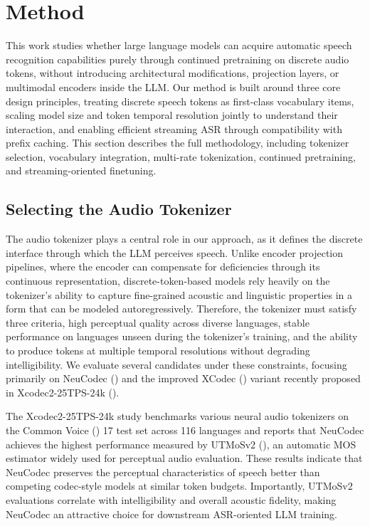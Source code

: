 \documentclass{article}
\begin{document}
\section{Method}

This work studies whether large language models can acquire automatic speech recognition capabilities purely through continued pretraining on discrete audio tokens, without introducing architectural modifications, projection layers, or multimodal encoders inside the LLM. Our method is built around three core design principles, treating discrete speech tokens as first-class vocabulary items, scaling model size and token temporal resolution jointly to understand their interaction, and enabling efficient streaming ASR through compatibility with prefix caching. This section describes the full methodology, including tokenizer selection, vocabulary integration, multi-rate tokenization, continued pretraining, and streaming-oriented finetuning.

\subsection{Selecting the Audio Tokenizer}

The audio tokenizer plays a central role in our approach, as it defines the discrete interface through which the LLM perceives speech. Unlike encoder projection pipelines, where the encoder can compensate for deficiencies through its continuous representation, discrete-token-based models rely heavily on the tokenizer's ability to capture fine-grained acoustic and linguistic properties in a form that can be modeled autoregressively. Therefore, the tokenizer must satisfy three criteria, high perceptual quality across diverse languages, stable performance on languages unseen during the tokenizer's training, and the ability to produce tokens at multiple temporal resolutions without degrading intelligibility. We evaluate several candidates under these constraints, focusing primarily on NeuCodec (\citet{julian2025finitescalarquantizationenables}) and the improved XCodec (\citet{ye2024codecdoesmatterexploring}) variant recently proposed in Xcodec2-25TPS-24k (\citet{zolkepli2026improvingxcodec20multilingualspeech}).

The Xcodec2-25TPS-24k study benchmarks various neural audio tokenizers on the Common Voice (\citet{ardila2020commonvoicemassivelymultilingualspeech}) 17 test set across 116 languages and reports that NeuCodec achieves the highest performance measured by UTMoSv2 (\citet{baba2024t05voicemoschallenge2024}), an automatic MOS estimator widely used for perceptual audio evaluation. These results indicate that NeuCodec preserves the perceptual characteristics of speech better than competing codec-style models at similar token budgets. Importantly, UTMoSv2 evaluations correlate with intelligibility and overall acoustic fidelity, making NeuCodec an attractive choice for downstream ASR-oriented LLM training.
\end{document}
